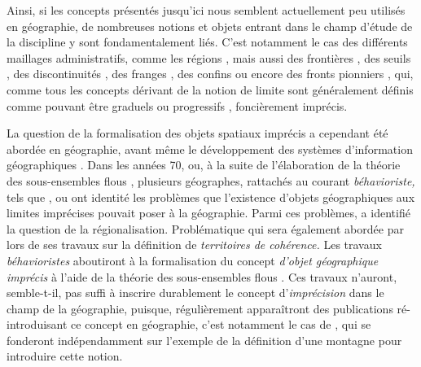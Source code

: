 Ainsi, si les concepts présentés jusqu’ici nous semblent actuellement
peu utilisés en géographie, de nombreuses notions et objets entrant
dans le champ d’étude de la discipline y sont fondamentalement
liés. C’est notamment le cas des différents maillages administratifs,
comme les régions \autocite{Brennetot2014}, mais aussi des frontières
\autocite{Brunet1992}, des seuils \autocite{Brunet1992, Levy2013}, des
discontinuités \autocite{Brunet1992, Brunet1997}, des franges
\autocite{Brunet1992}, des confins \autocite{Brunet1997} ou encore des
fronts pionniers \autocite{Brunet1992}, qui, comme tous les concepts
dérivant de la notion de limite sont généralement définis comme
pouvant être graduels ou progressifs \autocite{Brunet1992, Levy2013},
\ie foncièrement imprécis.

La question de la formalisation des objets spatiaux imprécis a
cependant été abordée en géographie, avant même le développement des
systèmes d’information géographiques \autocite{Robinson2003}. Dans les
années 70, ou, à la suite de l’élaboration de la théorie des
sous-ensembles flous \autocite{Zadeh1965}, plusieurs géographes,
rattachés au courant \emph{béhavioriste,} tels que
\textcite{Gale1972,Gale1976}, \textcite{Pipkin1978} ou
\textcite{Leung1979,Leung1987} ont identité les problèmes que
l’existence d’objets géographiques aux limites imprécises pouvait
poser à la géographie. Parmi ces problèmes, \textcite{Gale1976} a
identifié la question de la régionalisation. Problématique qui sera
également abordée par \textcite{Rolland-May1996,Rolland-May1987} lors
de ses travaux sur la définition de \emph{territoires de cohérence.}
Les travaux \emph{béhavioristes} aboutiront à la formalisation du
concept \emph{d’objet géographique imprécis} à l’aide de la théorie
des sous-ensembles flous \autocite{Leung1987}. Ces travaux n’auront,
semble-t-il, pas suffi à inscrire durablement le concept
d’\emph{imprécision} dans le champ de la géographie, puisque,
régulièrement apparaîtront des publications ré-introduisant ce concept
en géographie, c’est notamment le cas de \textcite{Fisher1998},
\textcite{Collins2000, Varzi2001} qui se fonderont indépendamment sur
l’exemple de la définition d’une montagne pour introduire cette
notion.

